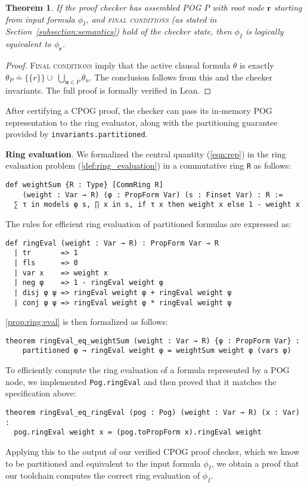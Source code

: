 \documentclass[twoside,11pt]{article}
\newcommand{\inputformula}{\phi_I}
\newcommand{\pogformula}{\theta_P}
\newcommand{\makenode}[1]{\mathbf{#1}}
\newcommand{\nodeu}{\makenode{u}}
\newcommand{\noder}{\makenode{r}}
\newtheorem{thm}{Theorem}
\begin{document}
\begin{thm}
\label{thm:lean:equiv}
If the proof checker has assembled POG $P$ with root node $\noder$ starting from input formula $\inputformula$, and \textsc{final conditions} (as stated in Section~\ref{subsection:semantics}) hold of the checker state, then $\inputformula$ is logically equivalent to $\phi_\noder$.
\end{thm}
\begin{proof}
\textsc{Final conditions} imply that the active clausal formula $\theta$ is exactly $\pogformula \doteq \{\{r\}\} \cup \; \bigcup_{\nodeu \in P} \theta_{u}$. The conclusion follows from this and the checker invariants. The full proof is formally verified in Lean.
\end{proof}
After certifying a CPOG proof, the checker can pass its in-memory POG representation to the ring evaluator, along with the partitioning guarantee provided by \texttt{invariants.partitioned}.

\vspace{1em}\noindent
\textbf{Ring evaluation}. We formalized the central quantity (\ref{eqn:rep}) in the ring evaluation problem
(\ref{def:ring_evaluation}) in a commutative ring \lstinline{R} as follows:
\begin{lstlisting}
def weightSum {R : Type} [CommRing R]
    (weight : Var → R) (φ : PropForm Var) (s : Finset Var) : R :=
  ∑ τ in models φ s, ∏ x in s, if τ x then weight x else 1 - weight x
\end{lstlisting}
The rules for efficient ring evaluation of partitioned formulas are expressed as:
\begin{lstlisting}
def ringEval (weight : Var → R) : PropForm Var → R
  | tr       => 1
  | fls      => 0
  | var x    => weight x
  | neg φ    => 1 - ringEval weight φ
  | disj φ ψ => ringEval weight φ + ringEval weight ψ
  | conj φ ψ => ringEval weight φ * ringEval weight ψ
\end{lstlisting}
\ref{prop:ring:eval} is then formalized as follows:
\begin{lstlisting}
theorem ringEval_eq_weightSum (weight : Var → R) {φ : PropForm Var} :
    partitioned φ → ringEval weight φ = weightSum weight φ (vars φ)
\end{lstlisting}
To efficiently compute the ring evaluation of a formula represented by a POG node, we implemented
\lstinline{Pog.ringEval} and then proved that it matches the specification above:
\begin{lstlisting}
theorem ringEval_eq_ringEval (pog : Pog) (weight : Var → R) (x : Var) :
  pog.ringEval weight x = (pog.toPropForm x).ringEval weight
\end{lstlisting}
Applying this to the output of our verified CPOG proof checker, which we know to be partitioned
and equivalent to the input formula $\inputformula$, we obtain a proof that our toolchain computes
the correct ring evaluation of $\inputformula$.
\end{document}
